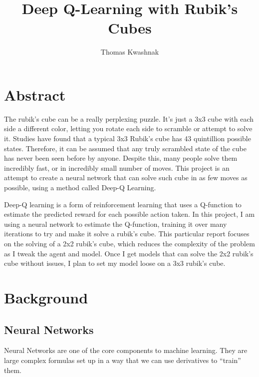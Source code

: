 \documentclass[12pt]{article}
\title{Deep Q-Learning with Rubik's Cubes}
\author{Thomas Kwashnak}
\begin{document}
\begin{titlepage}

	\maketitle

\end{titlepage}

\tableofcontents
\newpage


\section{Abstract}

The rubik's cube can be a really perplexing puzzle. It's just a 3x3 cube with each side a different color, letting you rotate each side to scramble or attempt to solve it. Studies have found that a typical 3x3 Rubik's cube has 43 quintillion possible states. Therefore, it can be assumed that any truly scrambled state of the cube has never been seen before by anyone. Despite this, many people solve them incredibly fast, or in incredibly small number of moves. This project is an attempt to create a neural network that can solve such cube in as few moves as possible, using a method called Deep-Q Learning.

Deep-Q learning is a form of reinforcement learning that uses a Q-function to estimate the predicted reward for each possible action taken. In this project, I am using a neural network to estimate the Q-function, training it over many iterations to try and make it solve a rubik's cube. This particular report focuses on the solving of a 2x2 rubik's cube, which reduces the complexity of the problem as I tweak the agent and model. Once I get models that can solve the 2x2 rubik's cube without issues, I plan to set my model loose on a 3x3 rubik's cube.


\newpage

\section{Background}

\subsection{Neural Networks}

Neural Networks are one of the core components to machine learning. They are large complex formulas set up in a way that we can use derivatives to ``train'' them.
\end{document}

